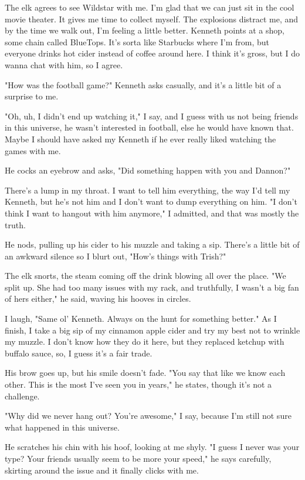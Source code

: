 The elk agrees to see Wildstar with me. I'm glad that we can just sit in the cool movie theater. It gives me time to collect myself. The explosions distract me, and by the time we walk out, I'm feeling a little better. Kenneth points at a shop, some chain called BlueTops. It's sorta like Starbucks where I'm from, but everyone drinks hot cider instead of coffee around here. I think it's gross, but I do wanna chat with him, so I agree.

"How was the football game?" Kenneth asks casually, and it's a little bit of a surprise to me.

"Oh, uh, I didn't end up watching it," I say, and I guess with us not being friends in this universe, he wasn't interested in football, else he would have known that. Maybe I should have asked my Kenneth if he ever really liked watching the games with me.

He cocks an eyebrow and asks, "Did something happen with you and Dannon?"

There's a lump in my throat. I want to tell him everything, the way I'd tell my Kenneth, but he's not him and I don't want to dump everything on him. "I don't think I want to hangout with him anymore," I admitted, and that was mostly the truth.

He nods, pulling up his cider to his muzzle and taking a sip. There's a little bit of an awkward silence so I blurt out, "How's things with Trish?"

The elk snorts, the steam coming off the drink blowing all over the place. "We split up. She had too many issues with my rack, and truthfully, I wasn't a big fan of hers either," he said, waving his hooves in circles.

I laugh, "Same ol' Kenneth. Always on the hunt for something better." As I finish, I take a big sip of my cinnamon apple cider and try my best not to wrinkle my muzzle. I don't know how they do it here, but they replaced ketchup with buffalo sauce, so, I guess it's a fair trade.

His brow goes up, but his smile doesn't fade. "You say that like we know each other. This is the most I've seen you in years," he states, though it's not a challenge.

"Why did we never hang out? You're awesome," I say, because I'm still not sure what happened in this universe.

He scratches his chin with his hoof, looking at me shyly. "I guess I never was your type? Your friends usually seem to be more your speed," he says carefully, skirting around the issue and it finally clicks with me.

